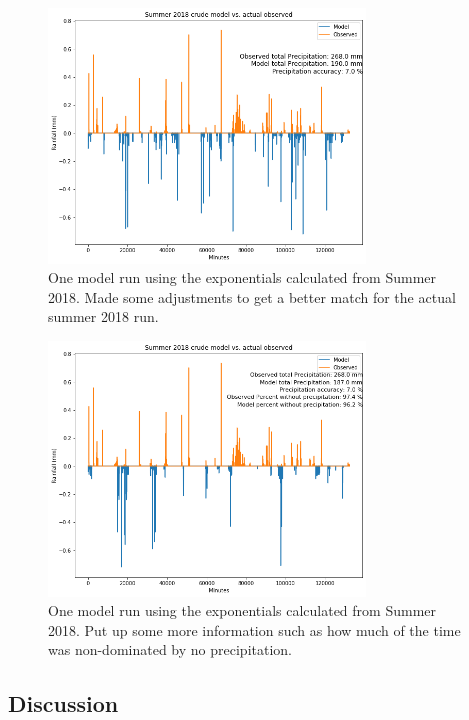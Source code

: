 \documentclass[11pt]{report}
\begin{document}
\begin{figure}[t]
  \centering
  \includegraphics[width=0.75\textwidth]{Figures/best_one_run.png}
  \caption[Modified run using Summer 2018 climatology]
  {\label{crudermodel}One model run using the exponentials calculated from
    Summer 2018. Made some adjustments to get a better match for the actual
    summer 2018 run.}
\end{figure}

\begin{figure}[b]
  \centering
  \includegraphics[width=0.75\textwidth]{Figures/run_with_more_info.png}
  \caption[More  run using Summer 2018 climatology]
  {\label{crudesmodel}One model run using the exponentials calculated from
    Summer 2018. Put up some more information such as how much of the time
    was non-dominated by no precipitation.}
\end{figure}
\clearpage

\subsection{Discussion}\label{sec:spc_d}
\end{document}
